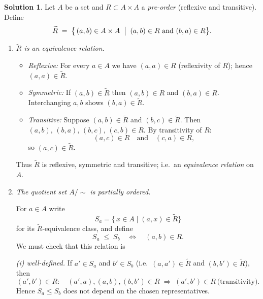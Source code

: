 \documentclass[12pt]{article}
\theoremstyle{definition} %
\newtheorem{solution}{Solution}
\theoremstyle{plain} %
\begin{document}
\begin{solution}
  
Let \(A\) be a set and \(R\subset A\times A\) a \emph{pre-order}
(reflexive and transitive).  Define
\[
   \widetilde R
      \;=\;
   \bigl\{\, (a,b)\in A\times A
            \;\bigm|\;
            (a,b)\in R\ \text{and}\ (b,a)\in R
       \bigr\}.
\]

\bigskip
\begin{enumerate}[label=\textbf{(\alph*)}]
\item \textit{\(\widetilde R\) is an equivalence relation.}

\begin{itemize}
   \item \emph{Reflexive:}  
         For every \(a\in A\) we have \((a,a)\in R\)
         (reflexivity of \(R\)); hence \((a,a)\in\widetilde R\).

   \item \emph{Symmetric:}  
         If \((a,b)\in\widetilde R\) then \((a,b)\in R\) and \((b,a)\in R\).
         Interchanging \(a,b\) shows \((b,a)\in\widetilde R\).

   \item \emph{Transitive:}  
         Suppose \((a,b)\in\widetilde R\) and \((b,c)\in\widetilde R\).
         Then
         \((a,b),\,(b,a),\,(b,c),\,(c,b)\in R\).
         By transitivity of \(R\):
         \[
            (a,c)\in R \quad\text{and}\quad (c,a)\in R ,
         \]
         so \((a,c)\in\widetilde R\).
\end{itemize}
Thus \(\widetilde R\) is reflexive, symmetric and transitive; i.e.\ an
\emph{equivalence relation} on \(A\).

\item \textit{The quotient set \(A/{\sim}\) is partially ordered.}

For \(a\in A\) write
\[
   S_a=\{\,x\in A\mid(a,x)\in\widetilde R\}
\]
for its \(\widetilde R\)-equivalence class, and define
\[
   S_a\;\le\;S_b
   \quad\Longleftrightarrow\quad
   (a,b)\in R .
\]
We must check that this relation is

\smallskip\emph{(i) well-defined.}
If \(a'\in S_a\) and \(b'\in S_b\) (i.e.\ \((a,a')\in\widetilde R\) and
\((b,b')\in\widetilde R\)), then
\[
   (a',b')\in R:
   \quad
   (a',a),(a,b),(b,b')\in R
   \;\Longrightarrow\;
   (a',b')\in R\ \text{(transitivity).}
\]
Hence \(S_a\le S_b\) does not depend on the chosen representatives.


\end{enumerate}
\end{solution}
\end{document}
